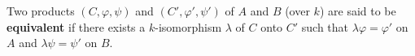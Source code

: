 Two products $(C, \varphi, \psi)$ and $(C', \varphi', \psi')$ of $A$ and $B$ (over $k$) are said to be \textbf{equivalent} if there exists a $k$-isomorphism $\lambda$ of $C$ onto $C'$ such that $\lambda\varphi = \varphi'$ on $A$ and $\lambda\psi = \psi'$ on $B$.
